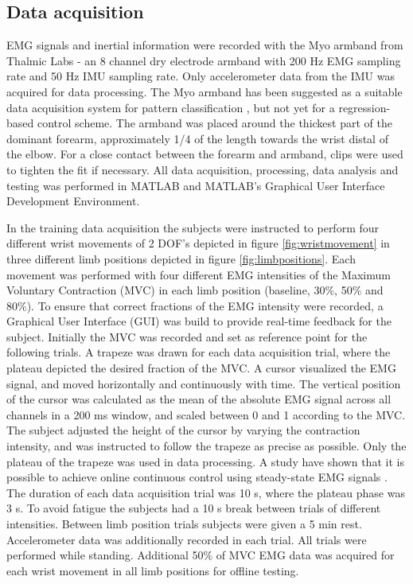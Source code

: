 \begin{multicols}{2}
\subsection*{Data acquisition}
EMG signals and inertial information were recorded with the Myo armband from Thalmic Labs - an 8 channel dry electrode armband with 200 Hz EMG sampling rate and 50 Hz IMU sampling rate. Only accelerometer data from the IMU was acquired for data processing. The Myo armband has been suggested as a suitable data acquisition system for pattern classification \cite{Mendez2017}, but not yet for a regression-based control scheme. 
The armband was placed around the thickest part of the dominant forearm, approximately 1/4 of the length towards the wrist distal of the elbow. For a close contact between the forearm and armband, clips were used to tighten the fit if necessary. All data acquisition, processing, data analysis and testing was performed in MATLAB and MATLAB's Graphical User Interface Development Environment.

In the training data acquisition the subjects were instructed to perform four different wrist movements of 2 DOF's depicted in figure \ref{fig:wristmovement} in three different limb positions depicted in figure \ref{fig:limbpositions}. Each movement was performed with four different EMG intensities of the Maximum Voluntary Contraction (MVC) in each limb position (baseline, 30\%, 50\% and 80\%). To ensure that correct fractions of the EMG intensity were recorded, a Graphical User Interface (GUI) was build to provide real-time feedback for the subject. Initially the MVC was recorded and set as reference point for the following trials. A trapeze was drawn for each data acquisition trial, where the plateau depicted the desired fraction of the MVC. A cursor visualized the EMG signal, and moved horizontally and continuously with time. The vertical position of the cursor was calculated as the mean of the absolute EMG signal across all channels in a 200 ms window, and scaled between 0 and 1 according to the MVC. The subject adjusted the height of the cursor by varying the contraction intensity, and was instructed to follow the trapeze as precise as possible. Only the plateau of the trapeze was used in data processing. A study have shown that it is possible to achieve online continuous control using steady-state EMG signals \cite{mobarak2014}. The duration of each data acquisition trial was 10 s, where the plateau phase was 3 s. To avoid fatigue the subjects had a 10 s break between trials of different intensities. Between limb position trials subjects were given a 5 min rest. Accelerometer data was additionally recorded in each trial. All trials were performed while standing.
Additional 50\% of MVC EMG data was acquired for each wrist movement in all limb positions for offline testing.


\end{multicols}
